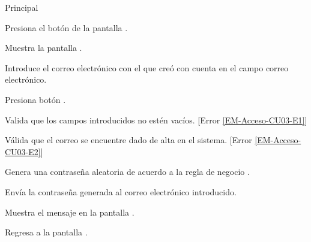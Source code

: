 	\begin{UCtrayectoria}{Principal}

		\UCpaso[\UCactor] Presiona el botón  de la pantalla .

		\UCpaso Muestra la pantalla .

		\UCpaso[\UCactor] Introduce el correo electrónico con el que creó con cuenta en el campo correo electrónico. \label{l_Acceso_CU3_E1}

		\UCpaso[\UCactor] Presiona botón .

		\UCpaso Valida que los campos introducidos no estén vacíos. [Error \ref{EM-Acceso-CU03-E1}]

		\UCpaso	 Válida que el correo se encuentre dado de alta en el sistema. [Error \ref{EM-Acceso-CU03-E2}] 

		\UCpaso Genera una contraseña aleatoria de acuerdo a la regla de negocio .

		\UCpaso Envía la contraseña generada al correo electrónico introducido.

	    \UCpaso Muestra el mensaje  en la pantalla .

	    \UCpaso Regresa a la pantalla .
	
	\end{UCtrayectoria}



		

